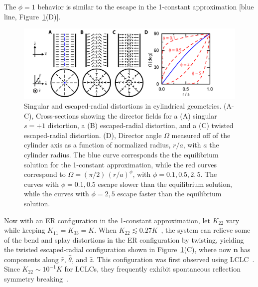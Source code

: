 The $\phi = 1$ behavior is similar to the escape in the 1-constant approximation [blue line, Figure~\ref{f:4-EscapeSchem}(D)].
\begin{figure}
  \centering
  \includegraphics{figures/C4/Ch4-Figs_EscapeSchem.png}
  \caption{Singular and escaped-radial distortions in cylindrical geometries.
  (A-C), Cross-sections showing the director fields for a (A) singular $s = +1$ distortion, a (B) escaped-radial distortion, and a (C) twisted escaped-radial distortion.
  (D), Director angle $\Omega$ measured off of the cylinder axis as a function of normalized radius, $r/a$, with $a$ the cylinder radius. The blue curve corresponds the the equilibrium solution for the 1-constant approximation, while the red curves correspond to $\Omega = (\pi/2)\,(r/a)^{\phi}$, with $\phi = 0.1,0.5,2,5$.
  The curves with $\phi = 0.1,0.5$ escape slower than the equilibrium solution, while the curves with $\phi = 2, 5$ escape faster than the equilibrium solution.}\label{f:4-EscapeSchem}
\end{figure}

Now with an ER configuration in the 1-constant approximation, let $K_{22}$ vary while keeping $K_{11} = K_{33} = K$.
When $K_{22} \lesssim 0.27K$~\cite{RN192}, the system can relieve some of the bend and splay distortions in the ER configuration by twisting, yielding the twisted escaped-radial configuration shown in Figure~\ref{f:4-EscapeSchem}(C), where now $\mathbf{n}$ has components along $\hat{r}$, $\hat{\theta}$, and $\hat{z}$.
This configuration was first observed using LCLC~\cite{RN192}.
Since $K_{22} \sim 10^{-1}K$ for LCLCs, they frequently exhibit spontaneous reflection symmetry breaking~\cite{RN192,RN191,RN293,RN193,RN302}.


